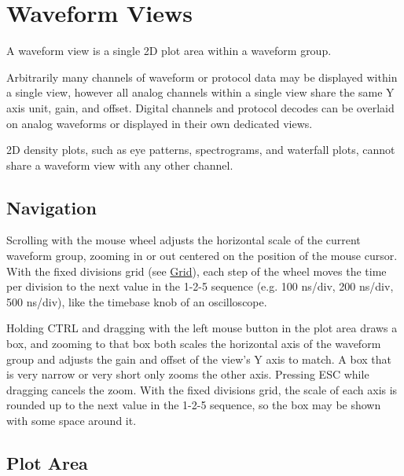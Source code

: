 \chapter{Waveform Views}

A waveform view is a single 2D plot area within a waveform group.

Arbitrarily many channels of waveform or protocol data may be displayed within a single view, however all analog
channels within a single view share the same Y axis unit, gain, and offset. Digital channels and protocol decodes can
be overlaid on analog waveforms or displayed in their own dedicated views.

2D density plots, such as eye patterns, spectrograms, and waterfall plots, cannot share a waveform view
with any other channel.

\section{Navigation}

Scrolling with the mouse wheel adjusts the horizontal scale of the current waveform group, zooming in or out centered
on the position of the mouse cursor. With the fixed divisions grid (see \hyperref[sec:grid]{Grid}), each step of the
wheel moves the time per division to the next value in the 1-2-5 sequence (e.g. 100 ns/div, 200 ns/div, 500 ns/div),
like the timebase knob of an oscilloscope.



Holding CTRL and dragging with the left mouse button in the plot area draws a box, and zooming to that box both scales
the horizontal axis of the waveform group and adjusts the gain and offset of the view's Y axis to match. A box that is
very narrow or very short only zooms the other axis. Pressing ESC while dragging cancels the zoom. With the fixed
divisions grid, the scale of each axis is rounded up to the next value in the 1-2-5 sequence, so the box may be shown
with some space around it.

\section{Plot Area}

